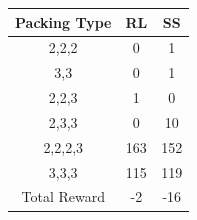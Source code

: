 \documentclass{article}
\begin{document}
\begin{table}[h!]
	\centering
	\begin{tabular}{ |c|c|c| } 
		\hline
		Packing Type & RL & SS \\ 
		\hline
		2,2,2 & 0 & 1 \\   
		\hline
		3,3 & 0 & 1 \\
		\hline
		2,2,3 & 1 & 0 \\
		\hline
		2,3,3 & 0 & 10 \\
		\hline
		2,2,2,3 & 163 & 152 \\
		\hline
		3,3,3 & 115 & 119 \\
		\hline
		Total Reward & -2 &-16 \\
		\hline
	\end{tabular}
\end{table}
\fi



\nocite{langley00}



\end{document}
